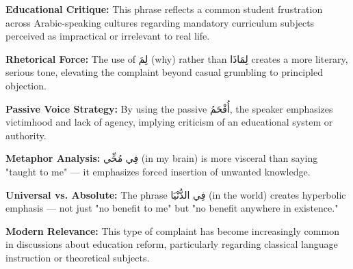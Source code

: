 \documentclass[letterpaper,12pt]{article}
\begin{document}
\begin{tcolorbox}[colback=boxcolor,colframe=accentcolor,title=\textbf{Cultural and Pragmatic Context},breakable]

\textbf{Educational Critique:} This phrase reflects a common student frustration across Arabic-speaking cultures regarding mandatory curriculum subjects perceived as impractical or irrelevant to real life.

\textbf{Rhetorical Force:} The use of \textarabic{لِمَ} (why) rather than \textarabic{لِمَاذَا} creates a more literary, serious tone, elevating the complaint beyond casual grumbling to principled objection.

\textbf{Passive Voice Strategy:} By using the passive \textarabic{أُقْحَمُ}, the speaker emphasizes victimhood and lack of agency, implying criticism of an educational system or authority.

\textbf{Metaphor Analysis:} \textarabic{فِي مُخِّي} (in my brain) is more visceral than saying "taught to me" — it emphasizes forced insertion of unwanted knowledge.

\textbf{Universal vs. Absolute:} The phrase \textarabic{فِي الدُّنْيَا} (in the world) creates hyperbolic emphasis — not just "no benefit to me" but "no benefit anywhere in existence."

\textbf{Modern Relevance:} This type of complaint has become increasingly common in discussions about education reform, particularly regarding classical language instruction or theoretical subjects.
\end{tcolorbox}
\end{document}
